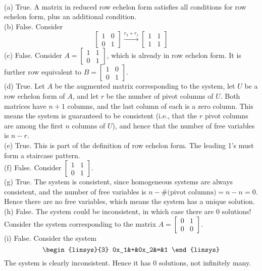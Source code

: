 \begin{solution} \ \\
(a) True. A matrix in reduced row echelon form satisfies all conditions for row echelon form, plus an additional condition. 
\\
(b) False. Consider \[
\begin{bmatrix}1&0\\0&1\end{bmatrix}\xrightarrow[]{r_2+r_1}\begin{bmatrix}
1&1\\ 1&1
\end{bmatrix}
\]
\noindent
(c) False. Consider $A=\begin{bmatrix}1&1\\0&1\end{bmatrix}$, which is already in row echelon form. It is further row equivalent to $B=\begin{bmatrix}1&0\\0&1\end{bmatrix}$.
\\
(d) True. Let $A$ be the augmented matrix corresponding to the system, let $U$ be a row echelon form of $A$, and let $r$ be the number of pivot columns of $U$. Both matrices have $n+1$ columns, and the last column of each is a zero column. This means the system is guaranteed to be consistent (i.e., that the $r$ pivot columns are among the first $n$ columns of $U$), and hence that the number of free variables is $n-r$. 
\\
(e) True. This is part of the definition of row echelon form. The leading 1's must form a staircase pattern. 
\\
(f) False. Consider $\begin{bmatrix}1&1\\0&1\end{bmatrix}$.
\\
(g) True. The system is consistent, since homogeneous systems are always consistent, and the number of free variables is $n-\#\text{(pivot columns)}=n-n=0$. Hence there are no free variables, which means the system has a unique solution. 
\\
(h) False. The system could be inconsistent, in which case there are 0 solutions! Consider the system corresponding to the matrix $A=\begin{bmatrix}0&1\\0&0\end{bmatrix}$. 
\\
(i) False. Consider the system 
\[
\begin{linsys}{3}
0x_1&+&0x_2&=&1
\end{linsys}
\]
The system is clearly inconsistent. Hence it has 0 solutions, not infinitely many. 
\end{solution}
\ee


